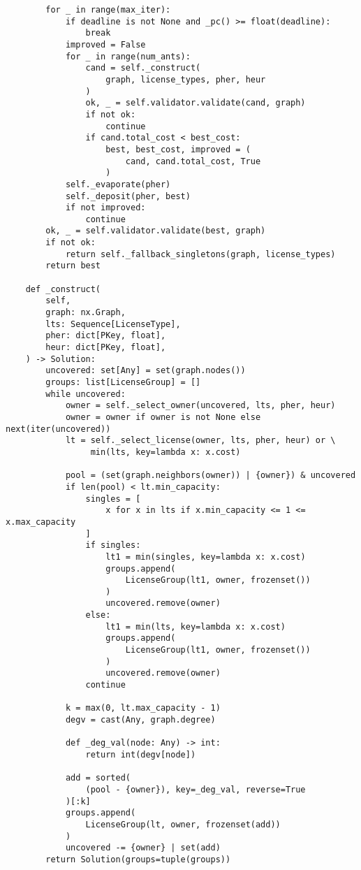 \begin{verbatim}
        for _ in range(max_iter):
            if deadline is not None and _pc() >= float(deadline):
                break
            improved = False
            for _ in range(num_ants):
                cand = self._construct(
                    graph, license_types, pher, heur
                )
                ok, _ = self.validator.validate(cand, graph)
                if not ok:
                    continue
                if cand.total_cost < best_cost:
                    best, best_cost, improved = (
                        cand, cand.total_cost, True
                    )
            self._evaporate(pher)
            self._deposit(pher, best)
            if not improved:
                continue
        ok, _ = self.validator.validate(best, graph)
        if not ok:
            return self._fallback_singletons(graph, license_types)
        return best

    def _construct(
        self,
        graph: nx.Graph,
        lts: Sequence[LicenseType],
        pher: dict[PKey, float],
        heur: dict[PKey, float],
    ) -> Solution:
        uncovered: set[Any] = set(graph.nodes())
        groups: list[LicenseGroup] = []
        while uncovered:
            owner = self._select_owner(uncovered, lts, pher, heur)
            owner = owner if owner is not None else next(iter(uncovered))
            lt = self._select_license(owner, lts, pher, heur) or \
                 min(lts, key=lambda x: x.cost)

            pool = (set(graph.neighbors(owner)) | {owner}) & uncovered
            if len(pool) < lt.min_capacity:
                singles = [
                    x for x in lts if x.min_capacity <= 1 <= x.max_capacity
                ]
                if singles:
                    lt1 = min(singles, key=lambda x: x.cost)
                    groups.append(
                        LicenseGroup(lt1, owner, frozenset())
                    )
                    uncovered.remove(owner)
                else:
                    lt1 = min(lts, key=lambda x: x.cost)
                    groups.append(
                        LicenseGroup(lt1, owner, frozenset())
                    )
                    uncovered.remove(owner)
                continue

            k = max(0, lt.max_capacity - 1)
            degv = cast(Any, graph.degree)

            def _deg_val(node: Any) -> int:
                return int(degv[node])

            add = sorted(
                (pool - {owner}), key=_deg_val, reverse=True
            )[:k]
            groups.append(
                LicenseGroup(lt, owner, frozenset(add))
            )
            uncovered -= {owner} | set(add)
        return Solution(groups=tuple(groups))


\end{verbatim}
